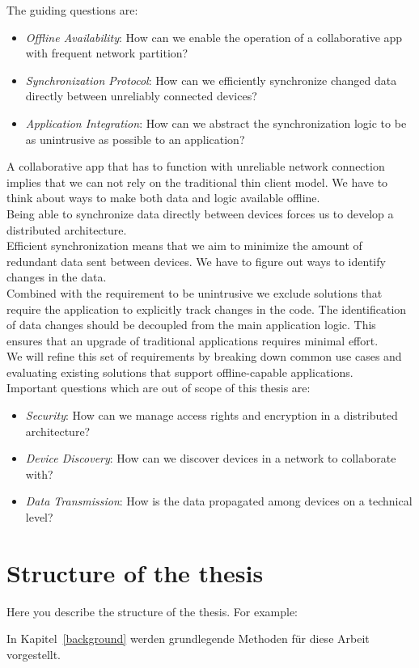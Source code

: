 The guiding questions are:
\begin{itemize}
\item \emph{Offline Availability}: How can we enable the operation of a collaborative app with frequent network partition?
\item \emph{Synchronization Protocol}: How can we efficiently synchronize changed data directly between unreliably connected devices?
\item \emph{Application Integration}: How can we abstract the synchronization logic to be as unintrusive as possible to an application?\\
\end{itemize}

A collaborative app that has to function with unreliable network connection implies that we can not rely on the traditional thin client model.
We have to think about ways to make both data and logic available offline.\\

Being able to synchronize data directly between devices forces us to develop a distributed architecture.\\

Efficient synchronization means that we aim to minimize the amount of redundant data sent between devices.
We have to figure out ways to identify changes in the data.\\

Combined with the requirement to be unintrusive we exclude solutions that require the application to explicitly track changes in the code.
The identification of data changes should be decoupled from the main application logic.
This ensures that an upgrade of traditional applications requires minimal effort.\\

We will refine this set of requirements by breaking down common use cases and evaluating existing solutions that support offline-capable applications.\\

Important questions which are out of scope of this thesis are:

\begin{itemize}
\item \emph{Security}: How can we manage access rights and encryption in a distributed architecture?
\item \emph{Device Discovery}: How can we discover devices in a network to collaborate with?
\item \emph{Data Transmission}: How is the data propagated among devices on a technical level?
\end{itemize}

\section{Structure of the thesis}
Here you describe the structure of the thesis. For example:

In Kapitel~\ref{background} werden grundlegende Methoden für diese Arbeit vorgestellt.